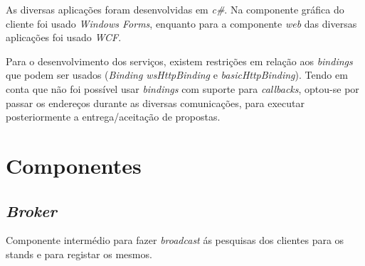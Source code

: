\documentclass[a4paper]{article}
\begin{document}
As diversas aplicações foram desenvolvidas em \emph{c\#}. Na componente gráfica do cliente foi usado \emph{Windows Forms}, enquanto para a componente \emph{web} das diversas aplicações foi usado \emph{WCF}.

Para o desenvolvimento dos serviços, existem restrições em relação aos \emph{bindings} que podem ser usados (\emph{Binding wsHttpBinding} e \emph{basicHttpBinding}). Tendo em conta que não foi possível usar \emph{bindings} com suporte para \emph{callbacks}, optou-se por passar os endereços durante as diversas comunicações, para executar posteriormente a entrega/aceitação de propostas.

\newpage

\section{Componentes}

\subsection{\emph{Broker} } Componente intermédio para fazer \emph{broadcast} ás pesquisas dos clientes para os stands e para registar os mesmos.
\end{document}
